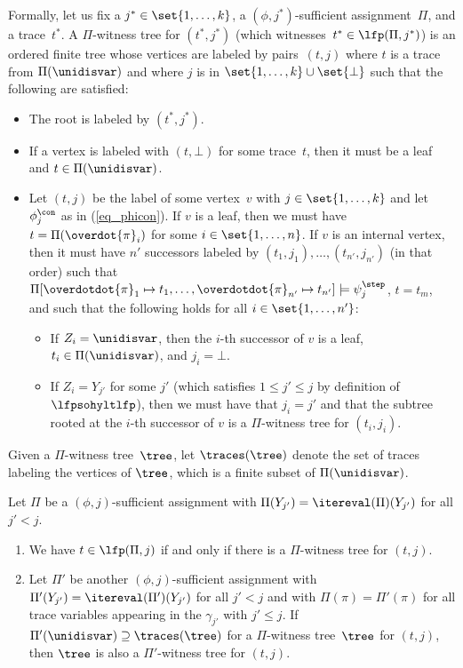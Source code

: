 Formally, let us fix a $j^* \in \set{1,\ldots,k}$, a $(\phi,j^*)$-sufficient assignment~$\Pi$, and a trace~$t^*$. 
A $\Pi$-witness tree for $(t^*,j^*)$ (which witnesses~$t^* \in\lfp(\Pi,j^*)$) is an ordered finite tree whose vertices are labeled by pairs~$(t,j)$ where $t$ is a trace from $\Pi(\unidisvar)$ and where $j $ is in $\set{1,\ldots, k} \cup \set{\bot}$ such that the following are satisfied:
\begin{itemize}
    \item The root is labeled by $(t^*, j^*)$.
        \item If a vertex is labeled with $(t,\bot)$ for some trace~$t$, then it must be a leaf and $t \in \Pi(\unidisvar)$.
        
        \item Let $(t,j)$ be the label of some vertex~$v$ with $j\in\set{1,\ldots,k}$ and let $\phi_j^\con$ as in (\ref{eq_phicon}).
If $v$ is a leaf, then we must have $t = \Pi(\overdot{\pi}_i)$ for some $i \in \set{1, \ldots, n}$.
If $v$ is an internal vertex, then it must have $n'$ successors labeled by $(t_1,j_1),\ldots,(t_{n'},j_{n'})$ (in that order) such that $\Pi[\overdotdot{\pi}_1 \mapsto t_1, \ldots, \overdotdot{\pi}_{n'} \mapsto t_{n'}] \models \psi^\step_j $, $t = t_m$, and
such that the following holds for all $i \in \set{1, \ldots, n'}$:
\begin{itemize}
    \item If $Z_i = \unidisvar$, then the $i$-th successor of $v$ is a leaf, $t_i \in \Pi(\unidisvar)$, and $j_i = \bot$.
    \item If $Z_i = Y_{j'}$ for some $j'$ (which satisfies $1 \le j' \le j$ by definition of $\lfpsohyltlfp$), then we must have that $ j_i = j'$ and that the subtree rooted at the $i$-th successor of $v$ is a $\Pi$-witness tree for $(t_i,j_i)$.
\end{itemize}
\end{itemize}

Given a $\Pi$-witness tree~$\tree$, let $\traces(\tree)$ denote the set of traces labeling the vertices of $\tree$, which is a finite subset of $\Pi(\unidisvar)$.

\begin{lem}
\label{lemma:witnesstreeprops}
Let $\Pi$ be a $(\phi,j)$-sufficient assignment with $\Pi(Y_{j'}) = \itereval(\Pi)(Y_{j'})$ for all $j' < j$.
\begin{enumerate}
    \item \label{lemma:witnesstreeprops_correctness}
    We have $t \in \lfp(\Pi, j)$ if and only if there is a $\Pi$-witness tree for $(t,j)$.

    \item\label{lemma:witnesstreeprops_restr}
    Let $\Pi'$ be another $(\phi, j)$-sufficient assignment with $\Pi'(Y_{j'}) = \itereval(\Pi')(Y_{j'})$ for all $j' < j$ and with $\Pi(\pi) = \Pi'(\pi)$ for all trace variables appearing in the $\gamma_{j'}$ with $j' \le j$.
    If $\Pi'(\unidisvar) \supseteq \traces(\tree)$ for a $\Pi$-witness tree~$\tree$ for $(t,j)$,
    then $\tree$ is also a $\Pi'$-witness tree for $(t,j)$.

\end{enumerate}
\end{lem}

